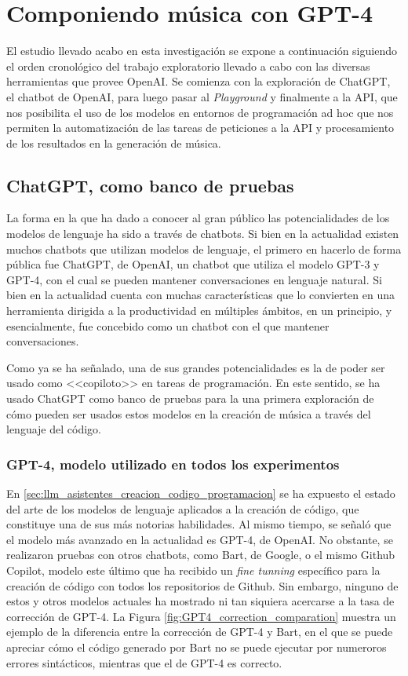 
\section{Componiendo música con GPT-4}
El estudio llevado acabo en esta investigación se expone a continuación siguiendo el orden cronológico del trabajo exploratorio llevado a cabo con las diversas herramientas que provee OpenAI. Se comienza con la exploración de ChatGPT, el chatbot de OpenAI, para luego pasar al \textit{Playground} y finalmente a la API, que nos posibilita el uso de los modelos en entornos de programación ad hoc que nos permiten la automatización de las tareas de peticiones a la API y procesamiento de los resultados en la generación de música.

\subsection{ChatGPT, como banco de pruebas}
La forma en la que ha dado a conocer al gran público las potencialidades de los modelos de lenguaje ha sido a través de chatbots. Si bien en la actualidad existen muchos chatbots que utilizan modelos de lenguaje, el primero en hacerlo de forma pública fue ChatGPT, de OpenAI, un chatbot que utiliza el modelo GPT-3 y GPT-4, con el cual se pueden mantener conversaciones en lenguaje natural. Si bien en la actualidad cuenta con muchas características que lo convierten en una herramienta dirigida a la productividad en múltiples ámbitos, en un principio, y esencialmente, fue concebido como un chatbot con el que mantener conversaciones.

Como ya se ha señalado, una de sus grandes potencialidades es la de poder ser usado como <<copiloto>> en tareas de programación. En este sentido, se ha usado ChatGPT como banco de pruebas para la una primera exploración de cómo pueden ser usados estos modelos en la creación de música a través del lenguaje del código.

\subsubsection{GPT-4, modelo utilizado en todos los experimentos}

En \ref{sec:llm_asistentes_creacion_codigo_programacion} se ha expuesto el estado del arte de los modelos de lenguaje aplicados a la creación de código, que constituye una de sus más notorias habilidades. Al mismo tiempo, se señaló que el modelo más avanzado en la actualidad es GPT-4, de OpenAI. No obstante, se realizaron pruebas con otros chatbots, como Bart, de Google, o el mismo Github Copilot, modelo este último que ha recibido un \textit{fine tunning} específico para la creación de código con todos los repositorios de Github. Sin embargo, ninguno de estos y otros modelos actuales ha mostrado ni tan siquiera acercarse a la tasa de corrección de GPT-4. La Figura \ref{fig:GPT4_correction_comparation} muestra un ejemplo de la diferencia entre la corrección de GPT-4 y Bart, en el que se puede apreciar cómo el código generado por Bart no se puede ejecutar por numeroros errores sintácticos, mientras que el de GPT-4 es correcto.


